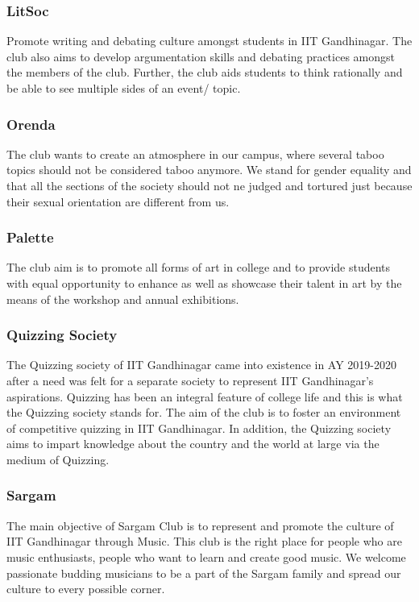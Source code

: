 \documentclass[12pt]{article}
\begin{document}
\subsubsection{LitSoc}
Promote writing and debating culture amongst students in IIT Gandhinagar. The club also aims to develop argumentation skills and debating practices amongst the members of the club. Further, the club aids students to think rationally and be able to see multiple sides of an event/ topic.

\subsubsection{Orenda}
The club wants to create an atmosphere in our campus, where several taboo topics should not be considered taboo anymore. We stand for gender equality and that all the sections of the society should not ne judged and tortured just because their sexual orientation are different from us.

\subsubsection{Palette}
The club aim is to promote all forms of art in college and to provide students with equal opportunity to enhance as well as showcase their talent in art by the means of the workshop and annual exhibitions.

\subsubsection{Quizzing Society}
The Quizzing society of IIT Gandhinagar came into existence in AY 2019-2020 after a need was felt for a separate society to represent IIT Gandhinagar’s aspirations. Quizzing has been an integral feature of college life and this is what the Quizzing society stands for. The aim of the club is to foster an environment of competitive quizzing in IIT Gandhinagar. In addition, the Quizzing society aims to impart knowledge about the country and the world at large via the medium of Quizzing.

\subsubsection{Sargam}
The main objective of Sargam Club is to represent and promote the culture of IIT Gandhinagar through Music. This club is the right place for people who are music enthusiasts, people who want to learn and create good music. We welcome passionate budding musicians to be a part of the Sargam family and spread our culture to every possible corner.
\end{document}
